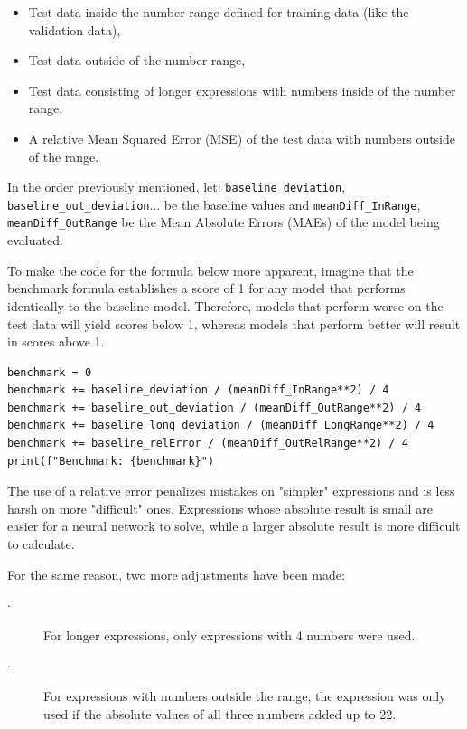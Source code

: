 \documentclass{article}
\begin{document}
\begin{itemize}
    \item[-] Test data inside the number range defined for training data (like the validation data),
    \item[-] Test data outside of the number range,
    \item[-] Test data consisting of longer expressions with numbers inside of the number range,
    \item[-] A relative Mean Squared Error (MSE) of the test data with numbers outside of the range.
\end{itemize}

In the order previously mentioned, let: {\small{\texttt{baseline\_deviation}}}, {\small{\texttt{baseline\_out\_deviation}}}... be the baseline values and {\small{\texttt{meanDiff\_InRange}}}, {\small{\texttt{meanDiff\_OutRange}}} be the Mean Absolute Errors (MAEs) of the model being evaluated.

To make the code for the formula below more apparent, imagine that the benchmark formula establishes a score of 1 for any model that performs identically to the baseline model. Therefore, models that perform worse on the test data will yield scores below 1, whereas models that perform better will result in scores above 1.
\begin{Verbatim}
benchmark = 0
benchmark += baseline_deviation / (meanDiff_InRange**2) / 4
benchmark += baseline_out_deviation / (meanDiff_OutRange**2) / 4
benchmark += baseline_long_deviation / (meanDiff_LongRange**2) / 4
benchmark += baseline_relError / (meanDiff_OutRelRange**2) / 4
print(f"Benchmark: {benchmark}")
\end{Verbatim}

The use of a relative error penalizes mistakes on "simpler" expressions and is less harsh on more "difficult" ones. Expressions whose absolute result is small are easier for a neural network to solve, while a larger absolute result is more difficult to calculate.

For the same reason, two more adjustments have been made: 
\begin{description}
    \item[$\cdot$] For longer expressions, only expressions with 4 numbers were used.
    \item[$\cdot$] For expressions with numbers outside the range, the expression was only used if the absolute values of all three numbers added up to 22.
\end{description}
\end{document}
